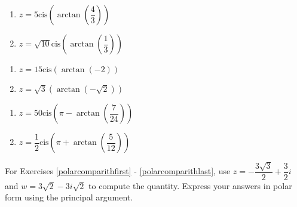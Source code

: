 \begin{multicols}{2} 

\begin{enumerate}

\setcounter{enumi}{\value{HW}}

\item $z = 5\text{cis}\left(\arctan\left(\dfrac{4}{3}\right)\right)$
\item $z = \sqrt{10}\text{cis}\left(\arctan\left(\dfrac{1}{3}\right)\right)$ 

\setcounter{HW}{\value{enumi}}

\end{enumerate}

\end{multicols}

\begin{multicols}{2} 

\begin{enumerate}

\setcounter{enumi}{\value{HW}}

\item $z = 15\text{cis}\left(\arctan\left(-2\right)\right)$ 
\item $z=  \sqrt{3}\left(\arctan\left(-\sqrt{2}\right)\right)$

\setcounter{HW}{\value{enumi}}

\end{enumerate}

\end{multicols}

\begin{multicols}{2} 

\begin{enumerate}

\setcounter{enumi}{\value{HW}}

\item $z = 50\text{cis}\left(\pi-\arctan\left(\dfrac{7}{24}\right)\right)$ 
\item  $z = \dfrac{1}{2}\text{cis}\left(\pi+\arctan\left(\dfrac{5}{12}\right)\right)$ \label{rectcomplast}

\setcounter{HW}{\value{enumi}}

\end{enumerate}

\end{multicols}

For Exercises \ref{polarcomparithfirst} - \ref{polarcomparithlast}, use $z = -\dfrac{3\sqrt{3}}{2} + \dfrac{3}{2}i$ and $w = 3\sqrt{2} - 3i\sqrt{2}$ to compute the quantity.  Express your answers in polar form using the principal argument.

